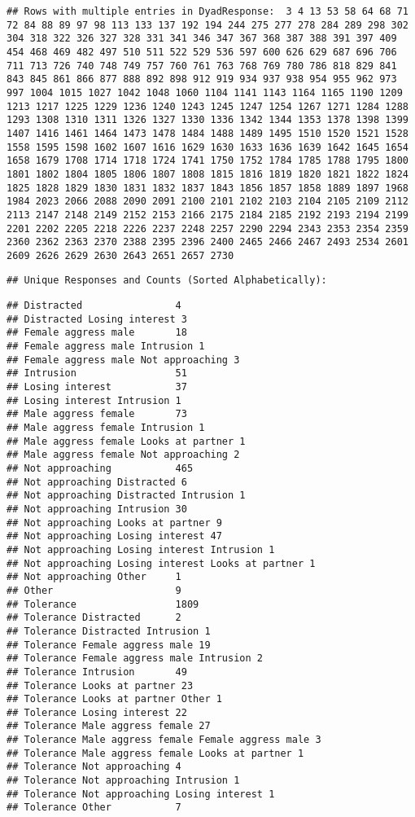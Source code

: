 \documentclass[
]{article}
\begin{document}
\begin{verbatim}
## Rows with multiple entries in DyadResponse:  3 4 13 53 58 64 68 71 72 84 88 89 97 98 113 133 137 192 194 244 275 277 278 284 289 298 302 304 318 322 326 327 328 331 341 346 347 367 368 387 388 391 397 409 454 468 469 482 497 510 511 522 529 536 597 600 626 629 687 696 706 711 713 726 740 748 749 757 760 761 763 768 769 780 786 818 829 841 843 845 861 866 877 888 892 898 912 919 934 937 938 954 955 962 973 997 1004 1015 1027 1042 1048 1060 1104 1141 1143 1164 1165 1190 1209 1213 1217 1225 1229 1236 1240 1243 1245 1247 1254 1267 1271 1284 1288 1293 1308 1310 1311 1326 1327 1330 1336 1342 1344 1353 1378 1398 1399 1407 1416 1461 1464 1473 1478 1484 1488 1489 1495 1510 1520 1521 1528 1558 1595 1598 1602 1607 1616 1629 1630 1633 1636 1639 1642 1645 1654 1658 1679 1708 1714 1718 1724 1741 1750 1752 1784 1785 1788 1795 1800 1801 1802 1804 1805 1806 1807 1808 1815 1816 1819 1820 1821 1822 1824 1825 1828 1829 1830 1831 1832 1837 1843 1856 1857 1858 1889 1897 1968 1984 2023 2066 2088 2090 2091 2100 2101 2102 2103 2104 2105 2109 2112 2113 2147 2148 2149 2152 2153 2166 2175 2184 2185 2192 2193 2194 2199 2201 2202 2205 2218 2226 2237 2248 2257 2290 2294 2343 2353 2354 2359 2360 2362 2363 2370 2388 2395 2396 2400 2465 2466 2467 2493 2534 2601 2609 2626 2629 2630 2643 2651 2657 2730
\end{verbatim}

\begin{verbatim}
## Unique Responses and Counts (Sorted Alphabetically):
\end{verbatim}

\begin{verbatim}
## Distracted                4
## Distracted Losing interest 3
## Female aggress male       18
## Female aggress male Intrusion 1
## Female aggress male Not approaching 3
## Intrusion                 51
## Losing interest           37
## Losing interest Intrusion 1
## Male aggress female       73
## Male aggress female Intrusion 1
## Male aggress female Looks at partner 1
## Male aggress female Not approaching 2
## Not approaching           465
## Not approaching Distracted 6
## Not approaching Distracted Intrusion 1
## Not approaching Intrusion 30
## Not approaching Looks at partner 9
## Not approaching Losing interest 47
## Not approaching Losing interest Intrusion 1
## Not approaching Losing interest Looks at partner 1
## Not approaching Other     1
## Other                     9
## Tolerance                 1809
## Tolerance Distracted      2
## Tolerance Distracted Intrusion 1
## Tolerance Female aggress male 19
## Tolerance Female aggress male Intrusion 2
## Tolerance Intrusion       49
## Tolerance Looks at partner 23
## Tolerance Looks at partner Other 1
## Tolerance Losing interest 22
## Tolerance Male aggress female 27
## Tolerance Male aggress female Female aggress male 3
## Tolerance Male aggress female Looks at partner 1
## Tolerance Not approaching 4
## Tolerance Not approaching Intrusion 1
## Tolerance Not approaching Losing interest 1
## Tolerance Other           7
\end{verbatim}
\end{document}
